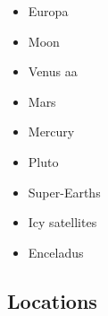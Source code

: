 \begin{itemize}
\item Europa \cite{shha04,shha05,mish05,hash08}\cite{hash10}\cite{hash11,kast14,almc19}
\item Moon \cite{elvh02}\cite{elhg04}\cite{devv10} \cite{zhdv19} 
\item Venus \cite{scbg90,lekb91,kiha92,sqjs92,kief93,lekb93,lekb95,mopa95,somo96,mazk98}
\cite{resm98}\cite{moso98}
a\cite{phha98}a\cite{resm99}
\cite{vavv05}\cite{stfh10}\cite{orso11,arta12}\cite{gita14}\cite{gery14b}\cite{cram17}\cite{dast17}\cite{king18}
\item Mars 
\cite{scbg90}
\cite{hach96}
\cite{resm98}
\cite{nist01}
\cite{lenm04}
\cite{vavv05}
\cite{losh06,rozh06,keso06}
\cite{rozh07}
\cite{loha08}
\cite{keta09,zhon09,rolm09,keso09}
\cite{srzh10}
\cite{gokg11}
\cite{srzh12}
\cite{ruts13}
\cite{seki14}
\cite{zhon16,kili16}
\cite{cimt18}
\item Mercury \cite{reki07,king08} 
\item Pluto \cite{mcnw16}
\item Super-Earths \cite{stfl11}\cite{stlh13}
\item Icy satellites \cite{kasc12b}
\item Enceladus \cite{roni08,hats12}
\end{itemize}

\subsection*{Locations}

